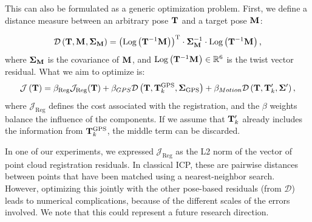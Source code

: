 This can also be formulated as a generic optimization problem. First, we define a distance measure between an arbitrary pose $\mathbf{T}_{}$ and a target pose $\mathbf{M}_{}$:

\newcommand{\customres}{\Log{\pose^{-1} \Mtx{}}}
\newcommand{\dfunc}[1]{\mathcal{D}\left({#1}\right)}
\newcommand{\costreg}{\mathcal{J}_{\text{Reg}}}
\newcommand{\betareg}{\beta_{\text{Reg}}}
\newcommand{\betagps}{\beta_{\text{GPS}}}
\newcommand{\xireg}{\xi_{\text{Reg}}}
\newcommand{\xiicp}{\xi_{\text{ICP}}}
\newcommand{\xigps}{\xi_{\text{GPS}}}
\begin{equation}
	\label{eq:mah-distance}
	\dfunc{\pose, \Mtx{}, \CovM} = \transpose{\left(\customres\right)} \cdot \CovM^{-1} \cdot \customres
	\comma
\end{equation}
where $\mathbf{\Sigma}_{\mathbf{M}}$ is the covariance of $\mathbf{M}_{}$, and $\customres \in \RR^6$ is the twist vector residual. What we aim to optimize is:
\begin{equation}
	\mathcal{J}\left(\pose\right) =
	\betareg \costreg(\pose) +
	\beta_{GPS} \dfunc{\pose, \tkgps, \covgps} +
	\beta_{Motion} \dfunc{\pose, \pose_k', \matx{\Sigma}'}
	\comma
\end{equation}
where $\costreg$ defines the cost associated with the registration, and the $\beta$ weights balance the influence of the components. If we assume that $\mathbf{T}_k'$ already includes the information from $\mathbf{T}_k^{\text{GPS}}$, the middle term can be discarded.

In one of our experiments, we expressed $\costreg$ as the L2 norm of the vector of point cloud registration residuals. In classical ICP, these are pairwise distances between points that have been matched using a nearest-neighbor search. However, optimizing this jointly with the other pose-based residuals (from $\mathcal{D}$) leads to numerical complications, because of the different scales of the errors involved. We note that this could represent a future research direction.

